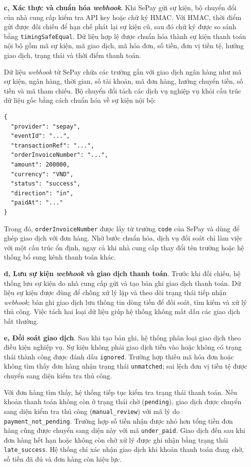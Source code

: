 \documentclass[../DoAn.tex]{subfiles}
\begin{document}
\textbf{c, Xác thực và chuẩn hóa \textit{webhook}}. Khi SePay gửi sự kiện, bộ chuyển đổi của nhà cung cấp kiểm tra API key hoặc chữ ký HMAC. Với HMAC, thời điểm gửi được đối chiếu để hạn chế phát lại sự kiện cũ, sau đó chữ ký được so sánh bằng \texttt{timingSafeEqual}. Dữ liệu hợp lệ được chuẩn hóa thành sự kiện thanh toán nội bộ gồm mã sự kiện, mã giao dịch, mã hóa đơn, số tiền, đơn vị tiền tệ, hướng giao dịch, trạng thái và thời điểm thanh toán.

Dữ liệu \textit{webhook} từ SePay chứa các trường gắn với giao dịch ngân hàng như mã sự kiện, ngân hàng, thời gian, số tài khoản, mã đơn hàng, hướng chuyển tiền, số tiền và mã tham chiếu. Bộ chuyển đổi tách các dịch vụ nghiệp vụ khỏi cấu trúc dữ liệu gốc bằng cách chuẩn hóa về sự kiện nội bộ:

\begin{verbatim}
{
  "provider": "sepay",
  "eventId": "...",
  "transactionRef": "...",
  "orderInvoiceNumber": "...",
  "amount": 200000,
  "currency": "VND",
  "status": "success",
  "direction": "in",
  "paidAt": "..."
}
\end{verbatim}

Trong đó, \texttt{orderInvoiceNumber} được lấy từ trường \texttt{code} của SePay và dùng để ghép giao dịch với đơn hàng. Nhờ bước chuẩn hóa, dịch vụ đối soát chỉ làm việc với một cấu trúc ổn định, ngay cả khi nhà cung cấp thay đổi tên trường hoặc hệ thống bổ sung kênh thanh toán khác.

\textbf{d, Lưu sự kiện \textit{webhook} và giao dịch thanh toán}. Trước khi đối chiếu, hệ thống lưu sự kiện do nhà cung cấp gửi và tạo bản ghi giao dịch thanh toán. Dữ liệu sự kiện được dùng để chống xử lý lặp và theo dõi trạng thái tiếp nhận \textit{webhook}; bản ghi giao dịch lưu thông tin dòng tiền để đối soát, tìm kiếm và xử lý thủ công. Việc tách hai loại dữ liệu giúp hệ thống không mất dấu các giao dịch bất thường.

\textbf{e, Đối soát giao dịch}. Sau khi tạo bản ghi, hệ thống phân loại giao dịch theo điều kiện nghiệp vụ. Sự kiện không phải giao dịch tiền vào hoặc không có trạng thái thành công được đánh dấu \texttt{ignored}. Trường hợp thiếu mã hóa đơn hoặc không tìm thấy đơn hàng nhận trạng thái \texttt{unmatched}; sai lệch đơn vị tiền tệ được chuyển sang diện kiểm tra thủ công.

Với đơn hàng tìm thấy, hệ thống tiếp tục kiểm tra trạng thái thanh toán. Nếu khoản thanh toán không còn ở trạng thái chờ (\texttt{pending}), giao dịch được chuyển sang diện kiểm tra thủ công (\texttt{manual\_review}) với mã lý do \texttt{payment\_not\_pending}. Trường hợp số tiền nhận được nhỏ hơn tổng tiền đơn hàng cũng được chuyển sang diện này với mã \texttt{under\_paid}. Giao dịch đến sau khi đơn hàng hết hạn hoặc không còn chờ xử lý được ghi nhận bằng trạng thái \texttt{late\_success}. Hệ thống chỉ xác nhận giao dịch khi khoản thanh toán đang chờ, số tiền đã đủ và đơn hàng còn hiệu lực.
\end{document}
